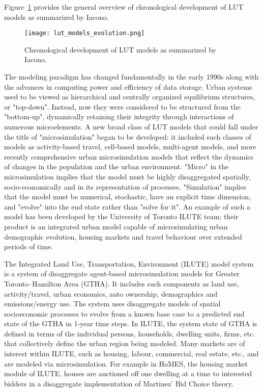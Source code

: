 Figure~\ref{fig:lut_model_evolution} provides the general overview of chronological development of LUT models as summarized by Iacono\cite{Iacono2008}.

\begin{figure}[hbt!]
    \centering
    \texttt{[image: lut\_models\_evolution.png]}
    \caption{Chronological development of LUT models as summarized by Iacono\cite{Iacono2008}.}
    \label{fig:lut_model_evolution}
\end{figure}

The modeling paradigm has changed fundamentally in the early 1990s along with the advances in computing power and efficiency of data storage.
Urban systems used to be viewed as hierarchical and centrally organized equilibrium structures, or "top-down".
Instead, now they were considered to be structured from the "bottom-up", dynamically retaining their integrity through interactions of numerous microelements\cite{Batty2008}.
A new broad class of LUT models that could fall under the title of "microsimulation" began to be developed: it included such classes of models as activity-based travel, cell-based models, multi-agent models, and more recently comprehensive urban microsimulation models that reflect the dynamics of changes in the population and the urban environment\cite{Iacono2008}.
"Micro" in the microsimulation implies that the model must be highly disaggregated spatially, socio-economically and in its representation of processes.
"Simulation" implies that the model must be numerical, stochastic, have an explicit time dimension, and "evolve" into the end state rather than "solve for it"\cite{Miller2018c}.
An example of such a model has been developed by the University of Toronto ILUTE team;
their product is an integrated urban model capable of microsimulating urban demographic evolution, housing markets and travel behaviour over extended periods of time\cite{Miller2018a}.

The Integrated Land Use, Transportation, Environment (ILUTE) model system is a system of disaggregate agent-based microsimulation models for Greater Toronto--Hamilton Area (GTHA).
It includes such components as land use, activity/travel, urban economics, auto ownership, demographics and emissions/energy use.
The system uses disaggregate models of spatial socioeconomic processes to evolve from a known base case to a predicted end state of the GTHA in 1-year time steps\cite{Miller2011}.
In ILUTE, the system state of GTHA is defined in terms of the individual persons, households, dwelling units, firms, etc.
that collectively define the urban region being modeled.
Many markets are of interest within ILUTE, such as housing, labour, commercial, real estate, etc., and are modeled via microsimulation.
For example in HoMES, the housing market module of ILUTE, houses are auctioned off one dwelling at a time to interested bidders in a disaggregate implementation of Martinez' Bid Choice theory\cite{Rosenfield2013,Martinez1992}.


